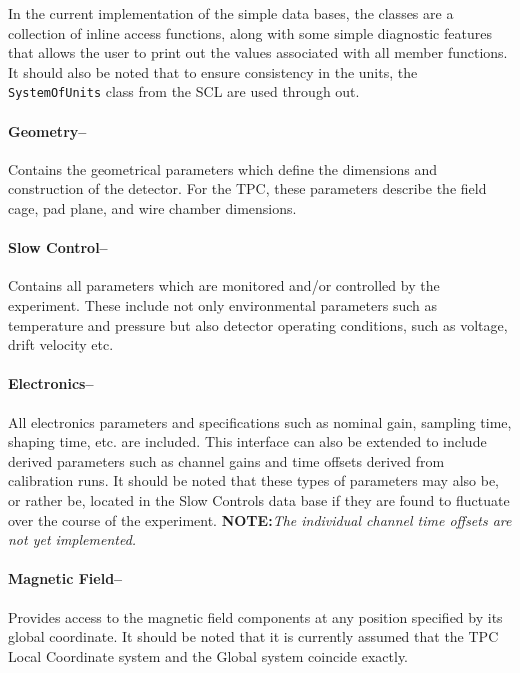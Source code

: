 \documentclass[twoside]{article}
\newcommand{\comp}[1]{\texttt{#1}}%
\begin{document}
In the current implementation of the simple data bases,
the classes are a collection of inline access functions,
along with some simple diagnostic features that allows the user to
print out the values associated with all member functions.  It should also
be noted that to ensure consistency in the units, the \comp{SystemOfUnits}
class from the SCL   are used
through out. 

\paragraph{Geometry--}

Contains the
geometrical parameters which define the dimensions and construction
of the detector.  For the TPC, these parameters describe the field
cage, pad plane, and wire chamber dimensions.

\paragraph{Slow Control--}

Contains all parameters which are monitored and/or controlled by 
the experiment.  These include not only environmental parameters such
as temperature and pressure but also detector operating conditions,
such as voltage, drift velocity etc.

\paragraph{Electronics--}

All electronics parameters and specifications such as nominal
gain, sampling time, shaping time, etc. are included.  This interface 
can also be extended to include derived parameters such as channel gains
and time offsets derived from calibration runs.  It should be noted
that these types of parameters may also be, or rather be, located in
the Slow Controls data base if they are found to fluctuate over the
course of the experiment.  {\bf NOTE:}{\em The individual channel time offsets are not yet implemented.}

\paragraph{Magnetic Field--}

Provides access to the magnetic field components at any position specified by
its global coordinate.  It should be noted that it is currently assumed that
the TPC Local Coordinate system and the Global system coincide exactly.
\end{document}
